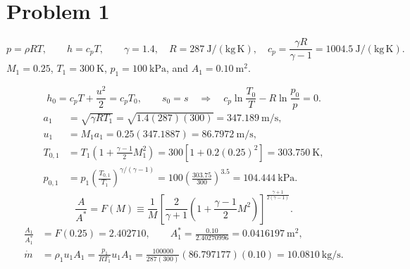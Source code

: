 \section*{Problem 1}


\[
p=\rho RT,\qquad h=c_pT,\qquad
\gamma=1.4,\quad R=287~\mathrm{J/(kg\,K)},\quad
c_p=\frac{\gamma R}{\gamma-1}=1004.5~\mathrm{J/(kg\,K)}.
\]
$M_1=0.25$, $T_1=300~\mathrm{K}$, $p_1=100~\mathrm{kPa}$, and $A_1=0.10~\mathrm{m^2}$.


\[
h_0=c_pT+\frac{u^2}{2}=c_pT_0,\qquad
s_0=s\quad\Longrightarrow\quad
c_p\ln\frac{T_0}{T}-R\ln\frac{p_0}{p}=0.
\]
\begin{align*}
a_1&=\sqrt{\gamma RT_1}=\sqrt{1.4(287)(300)}
=\boxed{347.189~\mathrm{m/s}},\\
u_1&=M_1a_1=0.25(347.1887)=\boxed{86.7972~\mathrm{m/s}},\\
T_{0,1}&=T_1\left(1+\frac{\gamma-1}{2}M_1^2\right)
=300[1+0.2(0.25)^2]=\boxed{303.750~\mathrm{K}},\\
p_{0,1}&=p_1\left(\frac{T_{0,1}}{T_1}\right)^{\gamma/(\gamma-1)}
=100\left(\frac{303.75}{300}\right)^{3.5}
=\boxed{104.444~\mathrm{kPa}}.
\end{align*}
\[
\frac{A}{A^*}=F(M)\equiv\frac{1}{M}
\left[\frac{2}{\gamma+1}\left(1+\frac{\gamma-1}{2}M^2\right)\right]
^{\frac{\gamma+1}{2(\gamma-1)}}.
\]
\begin{align*}
\frac{A_1}{A_1^*}&=F(0.25)=\boxed{2.402710},\qquad
A_1^*=\frac{0.10}{2.40270996}=\boxed{0.0416197~\mathrm{m^2}},\\
\dot m&=\rho_1u_1A_1=\frac{p_1}{RT_1}u_1A_1
=\frac{100000}{287(300)}(86.797177)(0.10)
=\boxed{10.0810~\mathrm{kg/s}}.
\end{align*}


